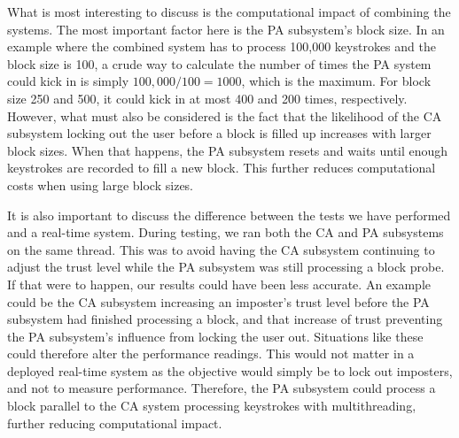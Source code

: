 What is most interesting to discuss is the computational impact of combining the systems.
The most important factor here is the PA subsystem's block size.
In an example where the combined system has to process 100,000 keystrokes and the block size is 100, a crude way to calculate the number of times the PA system could kick in is simply $100,000/100 = 1000$, which is the maximum.
For block size 250 and 500, it could kick in at most 400 and 200 times, respectively.
However, what must also be considered is the fact that the likelihood of the CA subsystem locking out the user before a block is filled up increases with larger block sizes.
When that happens, the PA subsystem resets and waits until enough keystrokes are recorded to fill a new block.
This further reduces computational costs when using large block sizes.

It is also important to discuss the difference between the tests we have performed and a real-time system.
During testing, we ran both the CA and PA subsystems on the same thread.
This was to avoid having the CA subsystem continuing to adjust the trust level while the PA subsystem was still processing a block probe.
If that were to happen, our results could have been less accurate.
An example could be the CA subsystem increasing an imposter's trust level before the PA subsystem had finished processing a block, and that increase of trust preventing the PA subsystem's influence from locking the user out.
Situations like these could therefore alter the performance readings.
This would not matter in a deployed real-time system as the objective would simply be to lock out imposters, and not to measure performance.
Therefore, the PA subsystem could process a block parallel to the CA system processing keystrokes with multithreading, further reducing computational impact.



